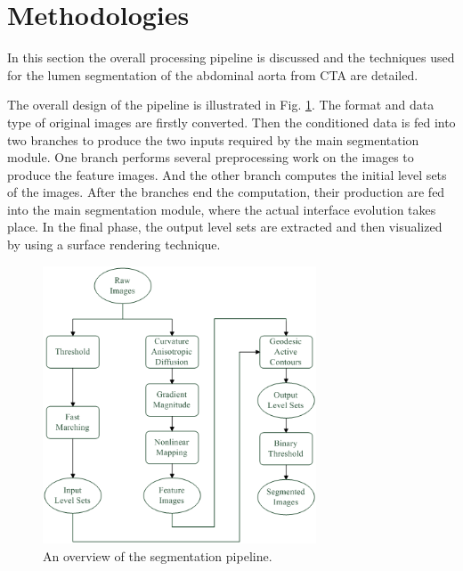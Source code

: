 \section{Methodologies}
\label{sec3_3}

In this section the overall processing pipeline is discussed and the techniques used for the lumen segmentation of the abdominal aorta from CTA are detailed.

The overall design of the pipeline is illustrated in Fig. \ref{fig:DataFlow}.
The format and data type of original images are firstly converted.
Then the conditioned data is fed into two branches to produce the two inputs required by the main segmentation module.
One branch performs several preprocessing work on the images to produce the feature images. %
And the other branch computes the initial level sets of the images. %
After the branches end the computation, their production are fed into the main segmentation module, where the actual interface evolution takes place.
In the final phase, the output level sets are extracted and then visualized by using a surface rendering technique.
\begin{figure}[t]
\centering
\includegraphics[width=3.2in]{Figures/chap03/DataFlow.png}
\caption{An overview of the segmentation pipeline.}
\label{fig:DataFlow}
\end{figure}

